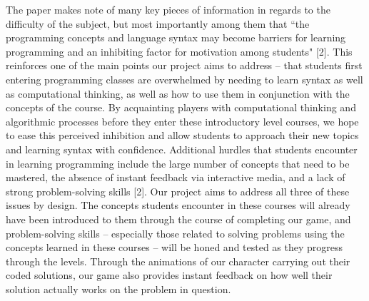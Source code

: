 The paper makes note of many key pieces of information in regards to the difficulty of 
the subject, but most importantly among them that ``the programming concepts and 
language syntax may become barriers for learning programming and an inhibiting factor 
for motivation among students" [2]. This reinforces one of the main points our project 
aims to address -- that students first entering programming classes are overwhelmed by 
needing to learn syntax as well as computational thinking, as well as how to use them in 
conjunction with the concepts of the course. By acquainting players with computational 
thinking and algorithmic processes before they enter these introductory level courses, 
we hope to ease this perceived inhibition and allow students to approach their new 
topics and learning syntax with confidence. Additional hurdles that students encounter 
in learning programming include the large number of concepts that need to be mastered, 
the absence of instant feedback via interactive media, and a lack of strong problem-solving 
skills [2]. Our project aims to address all three of these issues by design. The concepts 
students encounter in these courses will already have been introduced to them through 
the course of completing our game, and problem-solving skills -- especially those related 
to solving problems using the concepts learned in these courses -- will be honed and 
tested as they progress through the levels. Through the animations of our character 
carrying out their coded solutions, our game also provides instant feedback on how 
well their solution actually works on the problem in question.\\

